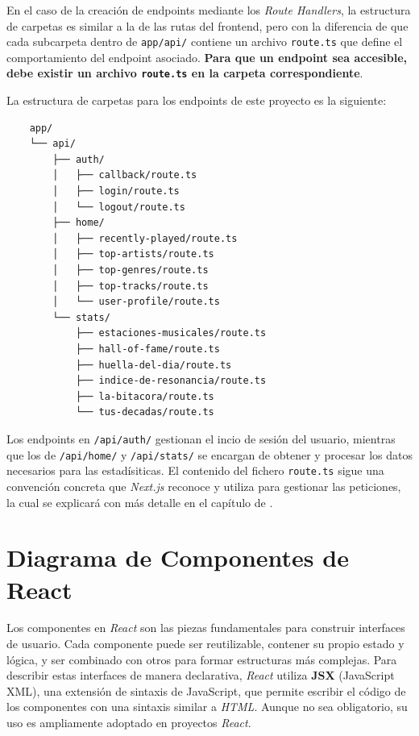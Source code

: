 En el caso de la creación de endpoints mediante los \textit{Route Handlers}, la estructura de carpetas es similar a la de las rutas del frontend, pero con la diferencia de que cada subcarpeta dentro de \texttt{app/api/} contiene un archivo \texttt{route.ts} que define el comportamiento del endpoint asociado. \textbf{Para que un endpoint sea accesible, debe existir un archivo \texttt{route.ts} en la carpeta correspondiente}.

La estructura de carpetas para los endpoints de este proyecto es la siguiente:

\newpage

\begin{verbatim}
    app/
    └── api/
        ├── auth/
        │   ├── callback/route.ts
        │   ├── login/route.ts
        │   └── logout/route.ts
        ├── home/
        │   ├── recently-played/route.ts
        │   ├── top-artists/route.ts
        │   ├── top-genres/route.ts
        │   ├── top-tracks/route.ts
        │   └── user-profile/route.ts
        └── stats/
            ├── estaciones-musicales/route.ts
            ├── hall-of-fame/route.ts
            ├── huella-del-dia/route.ts
            ├── indice-de-resonancia/route.ts
            ├── la-bitacora/route.ts
            └── tus-decadas/route.ts
\end{verbatim}

Los endpoints en \texttt{/api/auth/} gestionan el incio de sesión del usuario, mientras que los de \texttt{/api/home/} y \texttt{/api/stats/} se encargan de obtener y procesar los datos necesarios para las estadísiticas. El contenido del fichero \texttt{route.ts} sigue una convención concreta que \textit{Next.js} reconoce y utiliza para gestionar las peticiones, la cual se explicará con más detalle en el capítulo de .

\section{Diagrama de Componentes de React}

Los componentes en \textit{React} son las piezas fundamentales para construir interfaces de usuario. Cada componente puede ser reutilizable, contener su propio estado y lógica, y ser combinado con otros para formar estructuras más complejas. Para describir estas interfaces de manera declarativa, \textit{React} utiliza \textbf{JSX} (JavaScript XML), una extensión de sintaxis de JavaScript, que permite escribir el código de los componentes con una sintaxis similar a \textit{HTML}. Aunque no sea obligatorio, su uso es ampliamente adoptado en proyectos \textit{React}.

